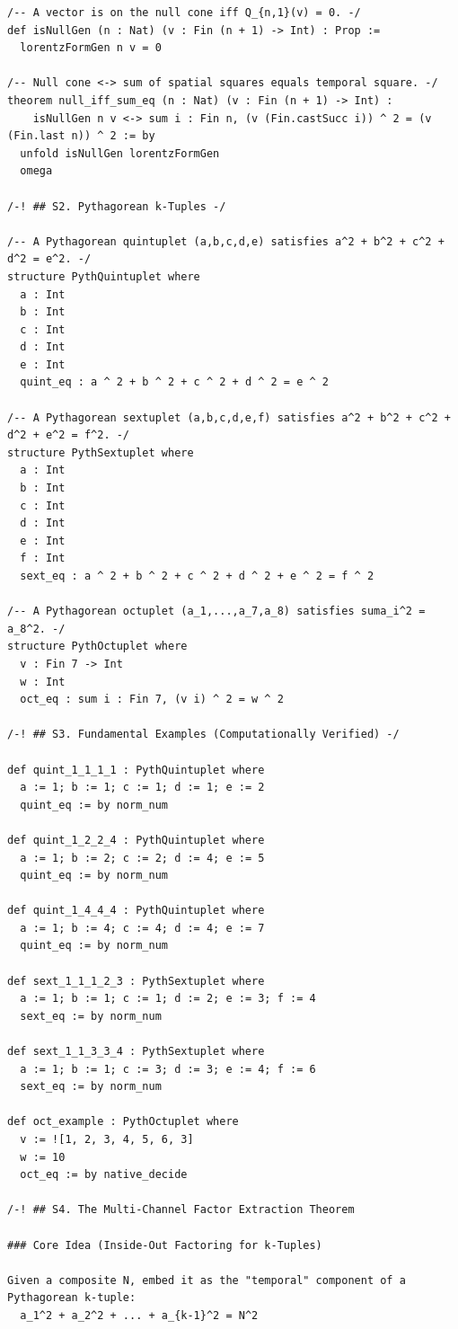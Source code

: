\documentclass[11pt,openright,twoside]{book}
\theoremstyle{definition}
\begin{document}
\begin{lstlisting}[style=lean]
/-- A vector is on the null cone iff Q_{n,1}(v) = 0. -/
def isNullGen (n : Nat) (v : Fin (n + 1) -> Int) : Prop :=
  lorentzFormGen n v = 0

/-- Null cone <-> sum of spatial squares equals temporal square. -/
theorem null_iff_sum_eq (n : Nat) (v : Fin (n + 1) -> Int) :
    isNullGen n v <-> sum i : Fin n, (v (Fin.castSucc i)) ^ 2 = (v (Fin.last n)) ^ 2 := by
  unfold isNullGen lorentzFormGen
  omega

/-! ## S2. Pythagorean k-Tuples -/

/-- A Pythagorean quintuplet (a,b,c,d,e) satisfies a^2 + b^2 + c^2 + d^2 = e^2. -/
structure PythQuintuplet where
  a : Int
  b : Int
  c : Int
  d : Int
  e : Int
  quint_eq : a ^ 2 + b ^ 2 + c ^ 2 + d ^ 2 = e ^ 2

/-- A Pythagorean sextuplet (a,b,c,d,e,f) satisfies a^2 + b^2 + c^2 + d^2 + e^2 = f^2. -/
structure PythSextuplet where
  a : Int
  b : Int
  c : Int
  d : Int
  e : Int
  f : Int
  sext_eq : a ^ 2 + b ^ 2 + c ^ 2 + d ^ 2 + e ^ 2 = f ^ 2

/-- A Pythagorean octuplet (a_1,...,a_7,a_8) satisfies suma_i^2 = a_8^2. -/
structure PythOctuplet where
  v : Fin 7 -> Int
  w : Int
  oct_eq : sum i : Fin 7, (v i) ^ 2 = w ^ 2

/-! ## S3. Fundamental Examples (Computationally Verified) -/

def quint_1_1_1_1 : PythQuintuplet where
  a := 1; b := 1; c := 1; d := 1; e := 2
  quint_eq := by norm_num

def quint_1_2_2_4 : PythQuintuplet where
  a := 1; b := 2; c := 2; d := 4; e := 5
  quint_eq := by norm_num

def quint_1_4_4_4 : PythQuintuplet where
  a := 1; b := 4; c := 4; d := 4; e := 7
  quint_eq := by norm_num

def sext_1_1_1_2_3 : PythSextuplet where
  a := 1; b := 1; c := 1; d := 2; e := 3; f := 4
  sext_eq := by norm_num

def sext_1_1_3_3_4 : PythSextuplet where
  a := 1; b := 1; c := 3; d := 3; e := 4; f := 6
  sext_eq := by norm_num

def oct_example : PythOctuplet where
  v := ![1, 2, 3, 4, 5, 6, 3]
  w := 10
  oct_eq := by native_decide

/-! ## S4. The Multi-Channel Factor Extraction Theorem

### Core Idea (Inside-Out Factoring for k-Tuples)

Given a composite N, embed it as the "temporal" component of a Pythagorean k-tuple:
  a_1^2 + a_2^2 + ... + a_{k-1}^2 = N^2


\end{lstlisting}
\end{document}

